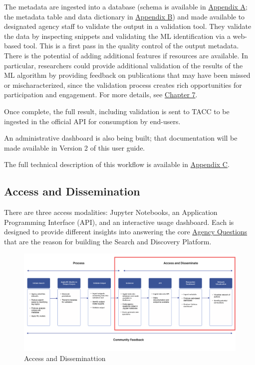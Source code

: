 \documentclass[titlepage, 11pt]{article}
\begin{document}
{The metadata are ingested into a database (schema is available in \hyperref[sec:APPENDIXA]{Appendix A}; the metadata table and data dictionary in \hyperref[sec:APPENDIXB]{Appendix B}) and made available to designated agency staff to validate the output in a validation tool.  They validate the data by inspecting snippets and validating the ML identification via a web-based tool.  This is a first pass in the quality control of the output metadata. There is the potential of adding additional features if resources are available. In particular, researchers could provide additional validation of the results of the ML algorithm by providing feedback on publications that may have been missed or mischaracterized, since the validation process creates rich opportunities for participation and engagement. For more details, see \hyperref[sec:Chapter7]{Chapter 7}.

Once complete, the full result, including validation is sent to TACC to be ingested in the official API for consumption by end-users.

An administrative dashboard is also being built; that documentation will be made available in Version 2 of this user guide.

The full technical description of this workflow is available in \hyperref[sec:APPENDIXC]{Appendix C}.

\subsection{Access and Dissemination}
There are three access modalities: Jupyter Notebooks, an Application Programming Interface (API), and an interactive usage dashboard.  Each is designed to provide different insights into answering the core \hyperref[subsec:Agencyquestions]{Agency Questions} that are the reason for building the Search and Discovery Platform.

\begin{figure}
  \includegraphics[scale=0.20]{Access.png}
  \vspace{-2.5ex}
  \caption{Access and Disseminattion}
    \vspace{-0.97ex}
  \label{fig:access}
\end{figure}

}
\end{document}
